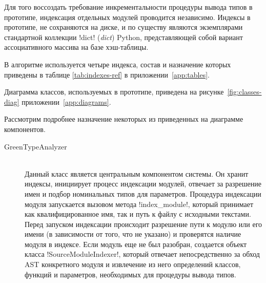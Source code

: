 Для того воссоздать требование инкрементальности процедуры вывода типов в
прототипе, индексация отдельных модулей проводится независимо. Индексы в
прототипе, не сохраняются на диске, и по существу являются экземплярами
стандартной коллекции !dict! (\emph{dict}) Python, представляющей собой
вариант ассоциативного массива на базе хэш-таблицы.

В алгоритме используется четыре индекса, состав и назначение которых приведены в
  таблице \ref{tab:indexes-ref} в приложении~\ref{app:tables}.

Диаграмма классов, используемых в прототипе, приведена на
 рисунке~\ref{fig:classes-diag} приложении~\ref{app:diagrams}.

Рассмотрим подробнее назначение некоторых из приведенных на диаграмме компонентов.

\begin{description}
  \item[GreenTypeAnalyzer] \hfill \\
    Данный класс является центральным компонентом системы. Он хранит индексы,
    инициирует процесс индексации модулей, отвечает за разрешение имен и подбор
    номинальных типов для параметров. Процедура индексации модуля запускается
    вызовом метода !index_module!, который принимает как квалифицированное имя,
    так и путь к файлу с исходными текстами. Перед запуском индексации
    происходит разрешение пути к модулю или его имени (в зависимости от того, что
    не указано) и проверятся наличие модуля в индексе. Если модуль еще не был
    разобран, создается объект класса !SourceModuleIndexer!, который отвечает
    непосредственно за обход AST конкретного модуля и извлечение из него
    определений классов, функций и параметров, необходимых для процедуры вывода
    типов.


\end{description}
